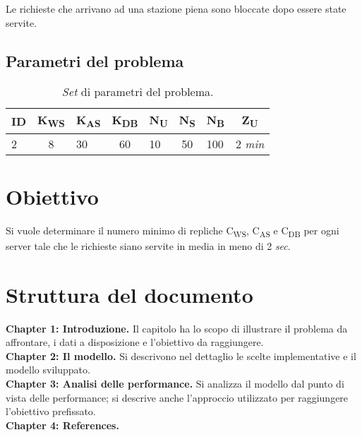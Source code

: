 \documentclass[../main.tex]{subfiles}
\begin{document}
    Le richieste che arrivano ad una stazione piena sono bloccate dopo essere state servite.

    \subsection{Parametri del problema}\label{subsec:parametri-del-problema}
    \begin{table}[h]
        \centering
        \begin{tabular}{|l|c|l|c|l|c|l|c|}
            \hline
            \textbf{ID} & \textbf{K\textsubscript{WS}} & \textbf{K\textsubscript{AS}} & \textbf{K\textsubscript{DB}}
            & \textbf{N\textsubscript{U}}
            & \textbf{N\textsubscript{S}}
            & \textbf{N\textsubscript{B}}
            & \textbf{Z\textsubscript{U}}\\ [0.5ex]
            \hline
            2           & 8                            & 30                           & 60                           & 10                          & 50                          & 100                         & 2 \textit{min}              \\
            \hline
        \end{tabular}
        \caption{\textit{Set} di parametri del problema.}
        \label{tab:set di parametri}
    \end{table}


    \section{Obiettivo}\label{sec:Obiettivo}
    Si vuole determinare il numero minimo di repliche C\textsubscript{WS}, C\textsubscript{AS} e C\textsubscript{DB}
    per ogni server tale che le richieste siano servite in media in meno di 2 \textit{sec}.
    
    \section{Struttura del documento}\label{sec:struttura-del-documento}
    \textbf{Chapter 1: Introduzione.}
    Il capitolo ha lo scopo di illustrare il problema da affrontare, i dati a disposizione e l'obiettivo da raggiungere.
    \\
    \textbf{Chapter 2: Il modello.}
    Si descrivono nel dettaglio le scelte implementative e il modello sviluppato.
    \\
    \textbf{Chapter 3: Analisi delle performance.}
    Si analizza il modello dal punto di vista delle performance; si descrive anche l'approccio utilizzato per raggiungere l'obiettivo prefissato.
    \\
    \textbf{Chapter 4: References.}
\end{document}

